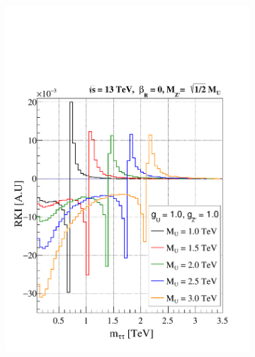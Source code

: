 \begin{figure}[]
\centering
    \begin{subfigure}[b]{.48\linewidth}
    \includegraphics[width=\linewidth]{Images/Kinematic_Interference_gu_1.0_gzp_1.0_zp_lower_limit_woRHC.pdf}
    \end{subfigure}
    \begin{subfigure}[b]{.48\linewidth}

\end{subfigure}
\end{figure}
